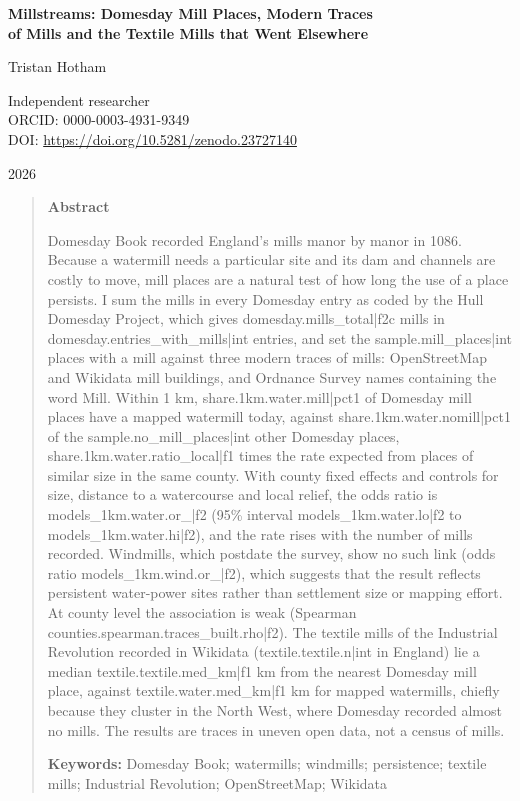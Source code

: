 \documentclass[11pt,a4paper]{article}
\begin{document}
\begin{center}
{\Large\bfseries Millstreams: Domesday Mill Places, Modern Traces\\[2pt] of Mills and the Textile Mills that Went Elsewhere\par}
\vspace{1.2em}
{\large Tristan Hotham\par}
\vspace{0.3em}
{\small Independent researcher\\
ORCID: 0000-0003-4931-9349\\
DOI: \href{https://doi.org/10.5281/zenodo.23727140}{https://doi.org/10.5281/zenodo.23727140}\par}
\vspace{0.8em}
2026
\end{center}

\begin{quote}
\small
\begin{center}\textbf{Abstract}\end{center}
Domesday Book recorded England's mills manor by manor in 1086. Because a watermill needs a particular site and its dam and channels are costly to move, mill places are a natural test of how long the use of a place persists. I sum the mills in every Domesday entry as coded by the Hull Domesday Project, which gives {{domesday.mills_total|f2c}} mills in {{domesday.entries_with_mills|int}} entries, and set the {{sample.mill_places|int}} places with a mill against three modern traces of mills: OpenStreetMap and Wikidata mill buildings, and Ordnance Survey names containing the word Mill. Within 1 km, {{share.1km.water.mill|pct1}} of Domesday mill places have a mapped watermill today, against {{share.1km.water.nomill|pct1}} of the {{sample.no_mill_places|int}} other Domesday places, {{share.1km.water.ratio_local|f1}} times the rate expected from places of similar size in the same county. With county fixed effects and controls for size, distance to a watercourse and local relief, the odds ratio is {{models_1km.water.or_|f2}} (95\% interval {{models_1km.water.lo|f2}} to {{models_1km.water.hi|f2}}), and the rate rises with the number of mills recorded. Windmills, which postdate the survey, show no such link (odds ratio {{models_1km.wind.or_|f2}}), which suggests that the result reflects persistent water-power sites rather than settlement size or mapping effort. At county level the association is weak (Spearman {{counties.spearman.traces_built.rho|f2}}). The textile mills of the Industrial Revolution recorded in Wikidata ({{textile.textile.n|int}} in England) lie a median {{textile.textile.med_km|f1}} km from the nearest Domesday mill place, against {{textile.water.med_km|f1}} km for mapped watermills, chiefly because they cluster in the North West, where Domesday recorded almost no mills. The results are traces in uneven open data, not a census of mills.

\textbf{Keywords:} Domesday Book; watermills; windmills; persistence; textile mills; Industrial Revolution; OpenStreetMap; Wikidata
\end{quote}
\end{document}
